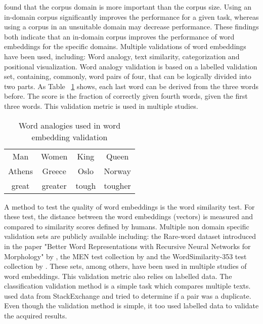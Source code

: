\documentclass[../../Thesis.tex]{subfiles}
\begin{document}
\citet{lai2016generate} found that 
the corpus domain is more important than the corpus size. Using an in-domain corpus significantly improves the performance for a given task, whereas using a corpus in an unsuitable domain may decrease performance. 
These findings both indicate that an in-domain corpus improves the performance of word embeddings for the specific domains. 
Multiple validations of word embeddings have been used, including: Word analogy, text similarity, categorization and positional visualization.
Word analogy validation is based on a labelled validation set, containing, commonly, word pairs of four, that can be logically divided into two parts. As  Table
~\ref{table:wordAnalogies} shows, each last word can be derived from the three words before. The score is the fraction of correctly given fourth words, given the first three words. This validation metric is used in multiple studies\cite{mikolov2013distributed, mikolov2013efficient, dai2015document, pennington2014glove}.
\begin{table}
\begin{center}
\begin{tabular}{c c c c}
Man & Women & King & Queen \\
Athens & Greece & Oslo & Norway\\
great & greater & tough & tougher
\end{tabular}
\end{center}
\caption{Word analogies used in word embedding validation}\label{table:wordAnalogies}
\end{table}
A method to test the quality of word embeddings is the word similarity test. For these test, the distance between the word embeddings (vectors) is measured and compared to similarity scores defined by humans. Multiple non domain specific validation sets are publicly available including: the Rare-word dataset introduced in the paper "Better Word Representations with Recursive Neural Networks for Morphology" by \citet{luong2013better}, 
the MEN test collection by \citet{EBruniMENCollection} and the WordSimilarity-353 test collection by \citet{EGabrilovichWScollection}.
These sets, among others, have been used in multiple studies of word embeddings\cite{pennington2014glove, mikolov2013efficient}. This validation metric also relies on labelled data.
The classification validation method is a simple task which compares multiple texts. \citet{lau2016empirical} used data from StackExchange and tried to determine if a pair was a duplicate. Even though the validation method is simple, it too used labelled data to validate the acquired results.
\end{document}
